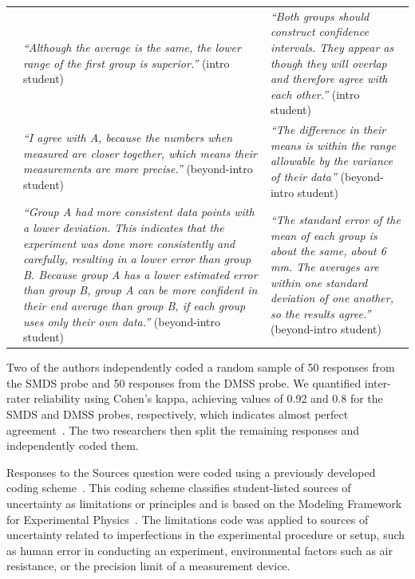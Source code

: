 \documentclass[english,aps,prstper,reprint,showpacs,longbibliography,superscriptaddress,nofootinbib]{revtex4-2}
\begin{document}
\begin{table}[tb]
\begin{ruledtabular}
\begin{tabular}{p{}p{}p{}}
    &\textit{``Although the average is the same, the lower range of the first group is superior.''} (intro student) &  \textit{``Both groups should construct confidence intervals. They appear as though they will overlap and therefore agree with each other.''} (intro student)\\
    & \textit{``I agree with A, because the numbers when measured are closer together, which means their measurements are more precise.''} (beyond-intro student) & \textit{``The difference in their means is within the range allowable by the variance of their data''} (beyond-intro student)\\
    & \textit{``Group A had more consistent data points with a lower deviation. This indicates that the experiment was done more consistently and carefully, resulting in a lower error than group B.
Because group A has a lower estimated error than group B, group A can be more confident in their end average than group B, if each group uses only their own data.''} (beyond-intro student)& \textit{``The standard error of the mean of each group is about the same, about 6 mm. The averages are within one standard deviation of one another, so the results agree.''} (beyond-intro student) \\
    \end{tabular}
  \end{ruledtabular}
\end{table}

Two of the authors independently coded a random sample of 50 responses from the SMDS probe and 50 responses from the DMSS probe. We quantified inter-rater reliability using Cohen's kappa, achieving values of 0.92 and 0.8 for the SMDS and DMSS probes, respectively, which indicates almost perfect agreement~\cite{Landis1977}. The two researchers then split the remaining responses and independently coded them.

Responses to the Sources question were coded using a previously developed coding scheme~\cite{StumpTBD}. This coding scheme classifies student-listed sources of uncertainty as limitations or principles and is based on the Modeling Framework for Experimental Physics~\cite{Zwickl2015,DounasFrazer2018}. The limitations code was applied to sources of uncertainty related to imperfections in the experimental procedure or setup, such as human error in conducting an experiment, environmental factors such as air resistance, or the precision limit of a measurement device.
\end{document}
